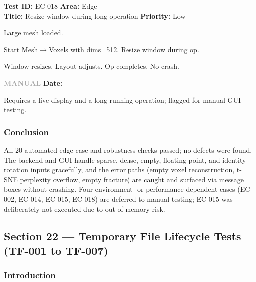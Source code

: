 \documentclass[12pt,a4paper]{article}
\newcommand{\manual}{\textcolor{darkgray}{\textbf{MANUAL}}}
\newcommand{\testheader}[4]{%
  \smallskip
  \noindent\textbf{Test ID:} #1 \hfill \textbf{Area:} #2 \\
  \textbf{Title:} #3 \hfill \textbf{Priority:} #4
}
\newenvironment{testbody}{%
  \begin{description}[leftmargin=2em,style=nextline]
}{%
  \end{description}
  \smallskip
}
\begin{document}
\testheader{EC-018}{Edge}{Resize window during long operation}{Low}
\begin{testbody}
  \item[\textbf{Preconditions:}] Large mesh loaded.
  \item[\textbf{Steps:}] Start Mesh$\rightarrow$Voxels with dims=512. Resize
        window during op.
  \item[\textbf{Expected Result:}] Window resizes. Layout adjusts. Op
        completes. No crash.
  \item[\textbf{Status:}] \manual{} \hspace{1em} \textbf{Date:} ---
  \item[\textbf{Notes:}] Requires a live display and a long-running operation;
        flagged for manual GUI testing.
\end{testbody}

\subsubsection{Conclusion}

All 20 automated edge-case and robustness checks passed; no defects were
found. The backend and GUI handle sparse, dense, empty, floating-point, and
identity-rotation inputs gracefully, and the error paths (empty voxel
reconstruction, t-SNE perplexity overflow, empty fracture) are caught and
surfaced via message boxes without crashing. Four environment- or
performance-dependent cases (EC-002, EC-014, EC-015, EC-018) are deferred to
manual testing; EC-015 was deliberately not executed due to out-of-memory
risk.

\newpage

\subsection{Section 22 --- Temporary File Lifecycle Tests (TF-001 to TF-007)}

\subsubsection{Introduction}
\end{document}
